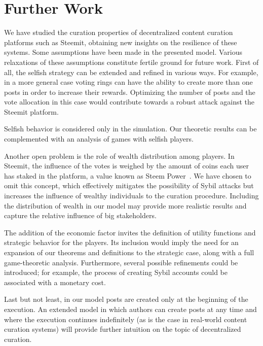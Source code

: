 \section{Further Work}

  We have studied the curation properties of decentralized content curation
  platforms such as Steemit, obtaining new insights on the resilience of these
  systems. Some assumptions have been made in the presented model. Various
  relaxations of these assumptions constitute fertile ground for future work.
  First of all, the selfish strategy can be extended and refined in various
  ways. For example, in a more general case voting rings can have the ability to
  create more than one posts in order to increase their rewards. Optimizing the
  number of posts and the vote allocation in this case would contribute towards
  a robust attack against the Steemit platform.

  Selfish behavior is considered only in the simulation. Our theoretic results
  can be complemented with an analysis of games with selfish players.

  Another open problem is the role of wealth distribution among players. In
  Steemit, the influence of the votes is weighed by the amount of coins each
  user has staked in the platform, a value known as Steem Power~\cite{steemit}.
  We have chosen to omit this concept, which effectively mitigates the
  possibility of Sybil attacks but increases the influence of wealthy
  individuals to the curation procedure. Including the distribution of wealth in
  our model may provide more realistic results and capture the relative
  influence of big stakeholders.

  The addition of the economic factor invites the definition of utility
  functions and strategic behavior for the players. Its inclusion would imply
  the need for an expansion of our theorems and definitions to the strategic
  case, along with a full game-theoretic analysis. Furthermore, several possible
  refinements could be introduced; for example, the process of creating Sybil
  accounts could be associated with a monetary cost.

  Last but not least, in our model posts are created only at the beginning of
  the execution. An extended model in which authors can create posts at any time
  and where the execution continues indefinitely (as is the case in real-world
  content curation systems) will provide further intuition on the topic of
  decentralized curation.
